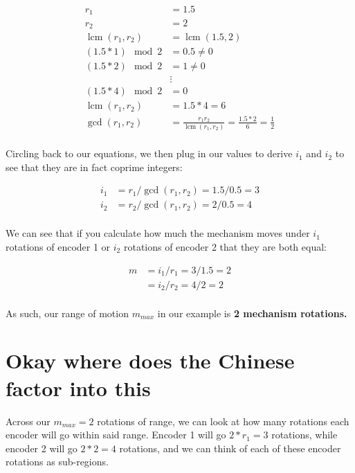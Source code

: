 \documentclass[11pt]{article}
\DeclareMathOperator{\lcm}{lcm}
\begin{document}
\begin{align*}
    r_1 &= 1.5\\r_2 &= 2\\
    \lcm(r_1, r_2) &= \lcm(1.5, 2)\\
    (1.5 * 1) \mod 2 &= 0.5 \neq 0\\
    (1.5 * 2) \mod 2 &= 1 \neq 0\\
    &\vdots\\
    (1.5 * 4) \mod 2 &= 0\\
    \lcm(r_1, r_2) &= 1.5 * 4 = 6\\
    \gcd(r_1, r_2) &= \frac{r_1r_2}{\lcm(r_1, r_2)} = \frac{1.5 * 2}{6}= \frac{1}{2}\\
\end{align*}

Circling back to our equations, we then plug in our values to derive $i_1$ and $i_2$ to see that they are in fact coprime integers:

\begin{align*}
    i_1 &= r_1 / \gcd(r_1, r_2) = 1.5 / 0.5 = 3\\
    i_2 &= r_2 / \gcd(r_1, r_2) = 2 / 0.5 = 4\\
\end{align*}

We can see that if you calculate how much the mechanism moves under $i_1$ rotations of encoder 1 or $i_2$ rotations of encoder 2 that they are both equal:

\begin{align*}
    m &= i_1 / r_1 = 3 / 1.5 = 2\\
    &= i_2 / r_2 = 4 / 2 = 2\\
\end{align*}

As such, our range of motion $m_{max}$ in our example is \textbf{2 mechanism rotations.}

\section{Okay where does the Chinese factor into this}

Across our $m_{max} = 2$ rotations of range, we can look at how many rotations each encoder will go within said range.
Encoder 1 will go $2 * r_1 = 3$ rotations, while encoder 2 will go $2 * 2 = 4$ rotations, and we can think of each of these encoder rotations as sub-regions.
\end{document}
